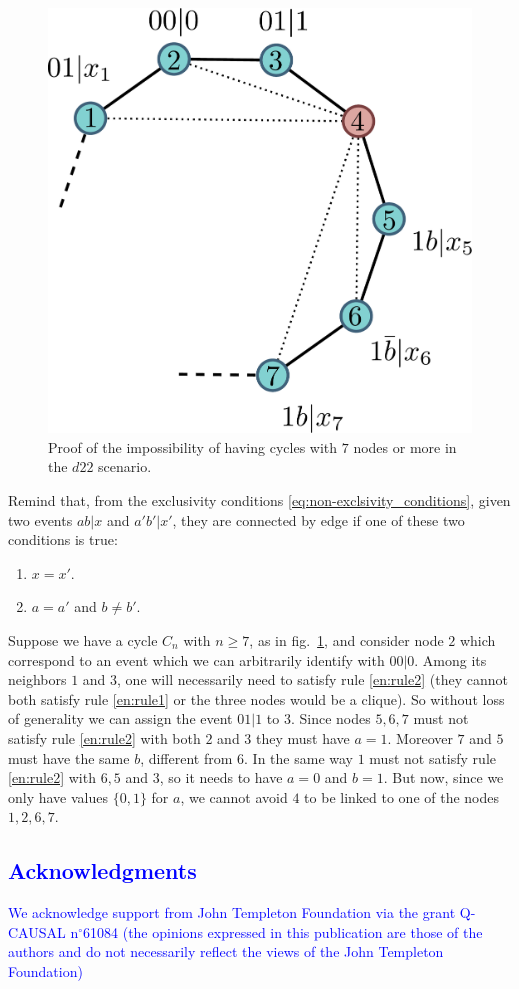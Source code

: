 \documentclass[
    nofootinbin,
    floatfix,
    amsfonts,
    twocolumn, 
    aps, 
    prl]{revtex4-1}
\begin{document}
\begin{figure}[h]
    \centering
    \includegraphics[width=.6\columnwidth]{images/cycle_proof.pdf}
    \caption{Proof of the impossibility of having cycles with $7$ nodes or more
    in the $d22$ scenario.}
    \label{fig:cycle_graph_proof}
\end{figure}
Remind that, from the exclusivity conditions \eqref{eq:non-exclsivity_conditions},
given two events $ab|x$ and $a'b'|x'$, they are connected by edge if one of
these two conditions is true:
\begin{enumerate}
    \item $x=x'$.\label{en:rule1}
    \item $a=a'$ and $b \neq b'$.\label{en:rule2}
\end{enumerate}
Suppose we have a cycle $C_n$ with $n \ge 7$, as in fig.~\ref{fig:cycle_graph_proof},
and consider node $2$ which correspond to an event which we can arbitrarily identify
with $00|0$.
Among its neighbors $1$ and $3$, one will necessarily need to satisfy rule 
\ref{en:rule2} (they cannot both satisfy rule \ref{en:rule1} or 
the three nodes would be a clique).
So without loss of generality we can assign the event $01|1$ to $3$.
Since nodes $5,6,7$ must not satisfy rule \ref{en:rule2} with both $2$ and $3$ 
they must have $a = 1$.
Moreover $7$ and $5$ must have the same $b$, different from $6$.
In the same way $1$ must not satisfy rule \ref{en:rule2} with $6,5$ and $3$, so it
needs to have $a=0$ and $b=1$.
But now, since we only have values $\{0,1\}$ for $a$, we cannot avoid $4$ 
to be linked to one of the nodes $1,2,6,7$.

\textcolor{blue}{
\section{Acknowledgments}
We acknowledge support from John Templeton Foundation via the grant Q-CAUSAL n$^{\circ}$61084 (the opinions expressed in this publication are those of the authors and do not necessarily reflect the views of the John Templeton
Foundation)}
\end{document}
